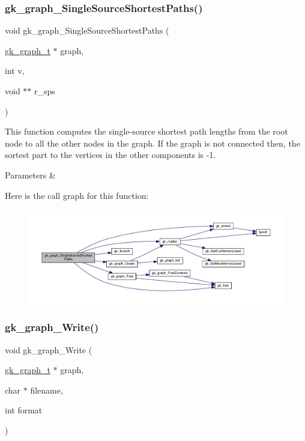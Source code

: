 \subsubsection{\texorpdfstring{gk\+\_\+graph\+\_\+\+Single\+Source\+Shortest\+Paths()}{gk\_graph\_SingleSourceShortestPaths()}}
{\footnotesize\ttfamily void gk\+\_\+graph\+\_\+\+Single\+Source\+Shortest\+Paths (\begin{DoxyParamCaption}\item[{\hyperlink{a00638}{gk\+\_\+graph\+\_\+t} $\ast$}]{graph,  }\item[{int}]{v,  }\item[{void $\ast$$\ast$}]{r\+\_\+sps }\end{DoxyParamCaption})}

This function computes the single-\/source shortest path lengths from the root node to all the other nodes in the graph. If the graph is not connected then, the sortest part to the vertices in the other components is -\/1.


\begin{DoxyParams}{Parameters}
{\em } & \\
\hline
\end{DoxyParams}
Here is the call graph for this function\+:\nopagebreak
\begin{figure}[H]
\begin{center}
\leavevmode
\includegraphics[width=350pt]{a00846_a4726366ef9bb2ef6a202d0fae0b60b3f_cgraph}
\end{center}
\end{figure}
\mbox{\label{a00846_a92bfa3f7bc76f9fb591ad67f665383e9}} 
\subsubsection{\texorpdfstring{gk\+\_\+graph\+\_\+\+Write()}{gk\_graph\_Write()}}
{\footnotesize\ttfamily void gk\+\_\+graph\+\_\+\+Write (\begin{DoxyParamCaption}\item[{\hyperlink{a00638}{gk\+\_\+graph\+\_\+t} $\ast$}]{graph,  }\item[{char $\ast$}]{filename,  }\item[{int}]{format }\end{DoxyParamCaption})}

